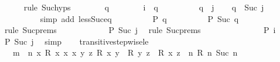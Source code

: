 \begin{isabellebody}
\ \ \ \ \isamarkupfalse%
\ {\isacharparenleft}{\kern0pt}rule\ Suc{\isachardot}{\kern0pt}hyps{\isacharparenright}{\kern0pt}\isanewline
\ \ \ \ \ \ \isamarkupfalse%
\ q\isanewline
\ \ \ \ \ \ \isamarkupfalse%
\ {\isachardoublequoteopen}i\ {\isasymle}\ q{\isachardoublequoteclose}\isanewline
\ \ \ \ \ \ \isamarkupfalse%
\ \isamarkupfalse%
\ {\isachardoublequoteopen}q\ {\isacharless}{\kern0pt}\ j{\isachardoublequoteclose}\ \isamarkupfalse%
\ \isamarkupfalse%
\ {\isachardoublequoteopen}q\ {\isacharless}{\kern0pt}\ Suc\ j{\isachardoublequoteclose}\isanewline
\ \ \ \ \ \ \ \ \isamarkupfalse%
\ {\isacharparenleft}{\kern0pt}simp\ add{\isacharcolon}{\kern0pt}\ less{\isacharunderscore}{\kern0pt}Suc{\isacharunderscore}{\kern0pt}eq{\isacharparenright}{\kern0pt}\isanewline
\ \ \ \ \ \ \isamarkupfalse%
\ \isamarkupfalse%
\ {\isachardoublequoteopen}P\ q{\isachardoublequoteclose}\isanewline
\ \ \ \ \ \ \isamarkupfalse%
\ \isamarkupfalse%
\ {\isachardoublequoteopen}P\ {\isacharparenleft}{\kern0pt}Suc\ q{\isacharparenright}{\kern0pt}{\isachardoublequoteclose}\ \isamarkupfalse%
\ {\isacharparenleft}{\kern0pt}rule\ Suc{\isachardot}{\kern0pt}prems{\isacharparenright}{\kern0pt}\isanewline
\ \ \ \ \isamarkupfalse%
\isanewline
\ \ \ \ \isamarkupfalse%
\ \isamarkupfalse%
\ {\isachardoublequoteopen}P\ {\isacharparenleft}{\kern0pt}Suc\ j{\isacharparenright}{\kern0pt}{\isachardoublequoteclose}\ \isamarkupfalse%
\ {\isacharparenleft}{\kern0pt}rule\ Suc{\isachardot}{\kern0pt}prems{\isacharparenright}{\kern0pt}\isanewline
\ \ \isamarkupfalse%
\isanewline
\ \ \ \ \isamarkupfalse%
\ {}\isanewline
\ \ \ \ \isamarkupfalse%
\ {\isacartoucheopen}P\ i{\isacartoucheclose}\ \isamarkupfalse%
\ {\isachardoublequoteopen}P\ {\isacharparenleft}{\kern0pt}Suc\ j{\isacharparenright}{\kern0pt}{\isachardoublequoteclose}\ \isamarkupfalse%
\ simp\isanewline
\ \ \isamarkupfalse%
\isanewline
{}\isamarkupfalse%
%
\endisatagproof
{\isafoldproof}%
%
\isadelimproof
\isanewline
%
\endisadelimproof
\isanewline
{}\isamarkupfalse%
\ transitive{\isacharunderscore}{\kern0pt}stepwise{\isacharunderscore}{\kern0pt}le{\isacharcolon}{\kern0pt}\isanewline
\ \ \ {\isachardoublequoteopen}m\ {\isasymle}\ n{\isachardoublequoteclose}\ {\isachardoublequoteopen}{\isasymAnd}x{\isachardot}{\kern0pt}\ R\ x\ x{\isachardoublequoteclose}\ {\isachardoublequoteopen}{\isasymAnd}x\ y\ z{\isachardot}{\kern0pt}\ R\ x\ y\ {\isasymLongrightarrow}\ R\ y\ z\ {\isasymLongrightarrow}\ R\ x\ z{\isachardoublequoteclose}\ \ {\isachardoublequoteopen}{\isasymAnd}n{\isachardot}{\kern0pt}\ R\ n\ {\isacharparenleft}{\kern0pt}Suc\ n{\isacharparenright}{\kern0pt}{\isachardoublequoteclose}\isanewline

\end{isabellebody}
